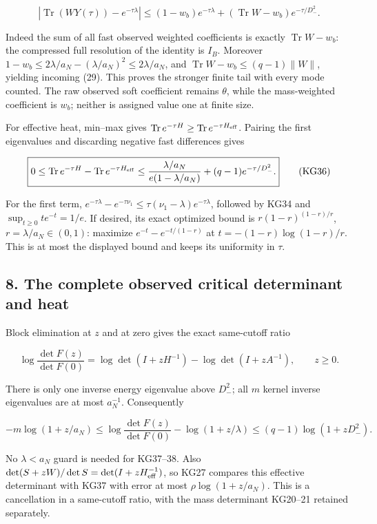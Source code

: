\documentclass[11pt]{article}
\begin{document}
\[
\boxed{\left|\operatorname{Tr}(WY(\tau))-e^{-\tau\lambda}\right|
\le(1-w_b)e^{-\tau\lambda}
 +(\operatorname{Tr}W-w_b)e^{-\tau/D_-^2}.}
\tag{KG35}
\]

Indeed the sum of all fast observed weighted coefficients is exactly \(\operatorname{Tr}W-w_b\): the compressed full resolution of the identity is \(I_B\). Moreover \(1-w_b\le2\lambda/a_N-(\lambda/a_N)^2\le2\lambda/a_N\), and \(\operatorname{Tr}W-w_b\le(q-1)\|W\|\), yielding incoming (29). This proves the stronger finite tail with every mode counted. The raw observed soft coefficient remains \(\theta\), while the mass-weighted coefficient is \(w_b\); neither is assigned value one at finite size.

For effective heat, min--max gives \(\operatorname{Tr}e^{-\tau H}\ge\operatorname{Tr}e^{-\tau H_{\rm eff}}\). Pairing the first eigenvalues and discarding negative fast differences gives

\[
\boxed{0\le\operatorname{Tr}e^{-\tau H}-\operatorname{Tr}e^{-\tau H_{\rm eff}}
\le\frac{\lambda/a_N}{e(1-\lambda/a_N)}+(q-1)e^{-\tau/D_-^2}.}
\tag{KG36}
\]

For the first term, \(e^{-\tau\lambda}-e^{-\tau\nu_1}\le\tau(\nu_1-\lambda)e^{-\tau\lambda}\), followed by KG34 and \(\sup_{t\ge0}te^{-t}=1/e\). If desired, its exact optimized bound is \(r(1-r)^{(1-r)/r}\), \(r=\lambda/a_N\in(0,1)\): maximize \(e^{-t}-e^{-t/(1-r)}\) at \(t=-(1-r)\log(1-r)/r\). This is at most the displayed bound and keeps its uniformity in \(\tau\).

\subsection{8. The complete observed critical determinant and heat}\label{the-complete-observed-critical-determinant-and-heat}

Block elimination at \(z\) and at zero gives the exact same-cutoff ratio

\[
\boxed{\log\frac{\det F(z)}{\det F(0)}
=\log\det(I+zH^{-1})-\log\det(I+zA^{-1}),\qquad z\ge0.}
\tag{KG37}
\]

There is only one inverse energy eigenvalue above \(D_-^2\); all \(m\) kernel inverse eigenvalues are at most \(a_N^{-1}\). Consequently

\[
\boxed{-m\log(1+z/a_N)\le
\log\frac{\det F(z)}{\det F(0)}-\log(1+z/\lambda)
\le(q-1)\log(1+zD_-^2).}
\tag{KG38}
\]

No \(\lambda<a_N\) guard is needed for KG37--38. Also \(\det(S+zW)/\det S=\det(I+zH_{\rm eff}^{-1})\), so KG27 compares this effective determinant with KG37 with error at most \(\rho\log(1+z/a_N)\). This is a cancellation in a same-cutoff ratio, with the mass determinant KG20--21 retained separately.
\end{document}

